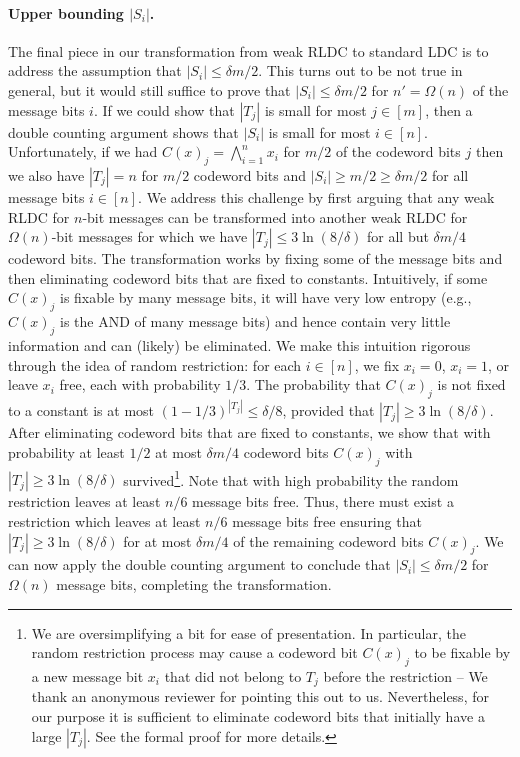 \documentclass[10pt,a4paper]{article}
\theoremstyle{remark}
\begin{document}
\paragraph{Upper bounding \texorpdfstring{$|S_i|$}{|S\_i|}.} The final piece in our transformation from weak RLDC to standard LDC is to address the assumption that $|S_i|\le \delta m/2$. This turns out to be not true in general, but it would still suffice to prove that $|S_i| \leq \delta m/2$ for $n' = \Omega(n)$ of the message bits $i$. If we could show that $|T_j|$ is small for most $j \in [m]$, then a double counting argument shows that $|S_i|$ is small for most $i \in [n]$. Unfortunately, if we had  $C(x)_j = \bigwedge_{i=1}^n x_i$ for $m/2$ of the codeword bits $j$ then we also have $|T_j| = n$ for $m/2$ codeword bits and $|S_i| \geq m/2 \geq \delta m/2$ for all message bits $i \in [n]$. We address this challenge by first arguing that any weak RLDC for $n$-bit messages can be transformed into another weak RLDC for $\Omega(n)$-bit messages for which we have $|T_j|  \le 3\ln(8/\delta) $ for all but $\delta m/4$ codeword bits. The transformation works by fixing some of the message bits and then eliminating codeword bits that are fixed to constants. Intuitively, if some $C(x)_j$ is fixable by many message bits, it will have very low entropy (e.g., $C(x)_j$ is the AND of many message bits) and hence contain very little information and can (likely) be eliminated. We make this intuition rigorous through the idea of random restriction: for each $i \in [n]$, we fix $x_i=0$, $x_i=1$, or leave $x_i$ free, each with probability $1/3$. The probability that $C(x)_j$ is not fixed to a constant is at most $(1-1/3)^{|T_j|}\le \delta/8$, provided that $|T_j| \ge 3\ln(8/\delta)$. After eliminating codeword bits that are fixed to constants, we show that with probability at least $1/2$ at most $\delta m/4$ codeword bits $C(x)_j$ with $|T_j| \ge 3\ln(8/\delta)$ survived\footnote{We are oversimplifying a bit for ease of presentation. In particular, the random restriction process may cause a codeword bit $C(x)_j$ to be fixable by a new message bit $x_i$ that did not belong to $T_j$ before the restriction -- We thank an anonymous reviewer for pointing this out to us.
Nevertheless, for our purpose it is sufficient to eliminate codeword bits that initially have a large $|T_j|$. See the formal proof for more details.}. Note that with high probability the random restriction leaves at least $n/6$ message bits free. Thus, there must exist a restriction which leaves at least $n/6$ message bits free ensuring that $|T_j| \ge 3\ln(8/\delta)$ for at most $\delta m/4$ of the remaining codeword bits $C(x)_j$. We can now apply the double counting argument to conclude that $|S_i| \le \delta m/2$ for $\Omega(n)$ message bits, completing the transformation.
\end{document}
